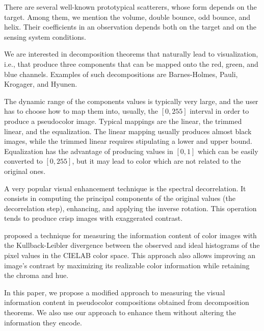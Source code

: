 \documentclass{article}
\begin{document}
There are several well-known prototypical scatterers, whose form depends on the target.
Among them, we mention the volume, double bounce, odd bounce, and helix.
Their coefficients in an observation depends both on the target and on the sensing system conditions.

We are interested in decomposition theorems that naturally lead to visualization, i.e., that produce three components that can be mapped onto the red, green, and blue channels.
Examples of such decompositions are Barnes-Holmes, Pauli, Krogager, and Hyunen.

The dynamic range of the components values is typically very large, and the user has to choose how to map them into, usually, the $[0,255]$ interval in order to produce a pseudocolor image.
Typical mappings are the linear,
the trimmed linear,
and the equalization.
The linear mapping usually produces almost black images, while the trimmed linear requires stipulating a lower and upper bound.
Equalization has the advantage of producing values in $[0,1]$ which can be easily converted to $[0,255]$, but it may lead to color which are not related to the original ones.

A very popular visual enhancement technique is the spectral decorrelation.
It consists in computing the principal components of the original values (the decorrelation step), enhancing, and applying the inverse rotation.
This operation tends to produce crisp images with exaggerated contrast.


\citet{AssessingInformationContentinColorImages} proposed a technique for measuring the information content of color images with the Kullback-Leibler divergence between the observed and ideal histograms of the pixel values in the CIELAB color space.
This approach also allows improving an image's contrast by maximizing its realizable color information while retaining the chroma and hue.

In this paper, we propose a modified approach to measuring the visual information content in pseudocolor compositions obtained from decomposition theorems.
We also use our approach to enhance them without altering the information they encode.
\end{document}
